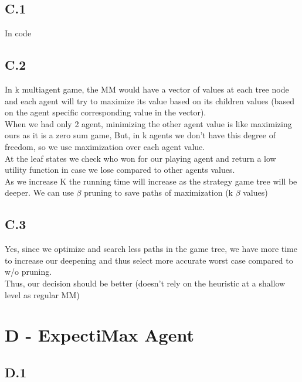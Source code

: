 \documentclass[12pt]{article}
\begin{document}
\subsection*{C.1}
In code 

\subsection*{C.2}
In k multiagent game, the MM would have a vector of values at each tree node and each agent will try to maximize its value based on its children values (based on the agent specific corresponding value in the vector).\\
When we had only 2 agent, minimizing the other agent value is like maximizing ours as it is a zero sum game, But, in k agents we don't have this degree of freedom, so we use maximization over each agent value.\\
At the leaf states we check who won for our playing agent and return a low utility function in case we lose compared to other agents values.\\
As we increase K the running time will increase as the strategy game tree  will be deeper. We can use $\beta$ pruning to save paths of maximization (k $\beta$ values)\\

\begin{comment}
The average branching factor (in the ideal case in which we prune all with ideal children ordering) $b'$ will be $\sqrt[k]{b}$ as the recursion formula (as seen on lecture) for the K case is:
$$T(d)= T(d-1) + (b-1)T(d-(k+1))$$
\end{comment}
\subsection*{C.3}
Yes, since we optimize and search less paths in the game tree, we have more time to increase our deepening and thus select more accurate worst case compared to w/o pruning.\\
Thus, our decision should be better (doesn't rely on the heuristic at a shallow level as regular MM)\\

\section*{D - ExpectiMax Agent}

\subsection*{D.1}
\end{document}
